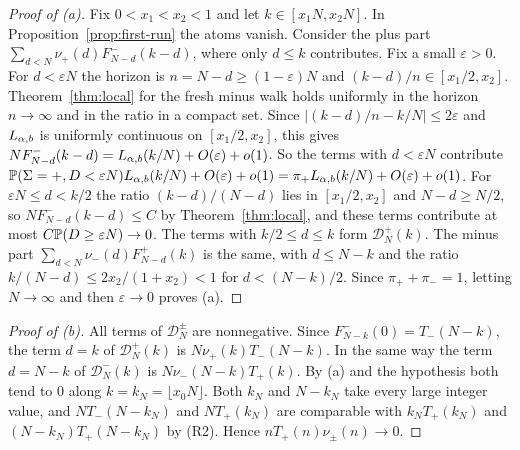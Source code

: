 \begin{proof}[Proof of (a)]
Fix $0<x_1<x_2<1$ and let $k\in[x_1N,x_2N]$. In Proposition~\ref{prop:first-run} the atoms
vanish. Consider the plus part $\sum_{d<N}\nu_\plus(d)F^\minus_{N-d}(k-d)$, where only
$d\le k$ contributes. Fix a small $\varepsilon>0$. For $d<\varepsilon N$ the horizon is
$n=N-d\ge(1-\varepsilon)N$ and $(k-d)/n\in[x_1/2,x_2]$. Theorem~\ref{thm:local} for the
fresh minus walk holds uniformly in the horizon $n\to\infty$ and in the ratio in a
compact set. Since $|(k-d)/n-k/N|\le2\varepsilon$ and $L_{\alpha,b}$ is uniformly continuous on
$[x_1/2,x_2]$, this gives $NF^{-}_{N-d}(k-d)=L_{\alpha,b}(k/N)+O(\varepsilon)+o(1)$. So the
terms with $d<\varepsilon N$ contribute $\mathbb{P}(\Sigma={+},D<\varepsilon N)L_{\alpha,b}(k/N)+O(\varepsilon)+o(1)
=\pi_{+}L_{\alpha,b}(k/N)+O(\varepsilon)+o(1)$. For $\varepsilon N\le d<k/2$ the ratio
$(k-d)/(N-d)$ lies in $[x_1/2,x_2]$ and $N-d\ge N/2$, so $NF^\minus_{N-d}(k-d)\le C$ by
Theorem~\ref{thm:local}, and these terms contribute at most $C\mathbb{P}(D\ge\varepsilon N)\to0$.
The terms with $k/2\le d\le k$ form $\mathcal D^\plus_N(k)$. The minus part
$\sum_{d<N}\nu_\minus(d)F^\plus_{N-d}(k)$ is the same, with $d\le N-k$ and the ratio
$k/(N-d)\le2x_2/(1+x_2)<1$ for $d<(N-k)/2$. Since $\pi_\plus+\pi_\minus=1$, letting
$N\to\infty$ and then $\varepsilon\to0$ proves (a).
\end{proof}

\begin{proof}[Proof of (b)]
All terms of $\mathcal D^\pm_N$ are nonnegative. Since $F^\minus_{N-k}(0)=T_\minus(N-k)$, the
term $d=k$ of $\mathcal D^\plus_N(k)$ is $N\nu_\plus(k)T_\minus(N-k)$. In the same way the
term $d=N-k$ of $\mathcal D^\minus_N(k)$ is $N\nu_\minus(N-k)T_\plus(k)$. By (a) and the hypothesis both tend
to $0$ along $k=k_N=\lfloor x_0N\rfloor$. Both $k_N$ and $N-k_N$ take every large integer
value, and $NT_\minus(N-k_N)$ and $NT_\plus(k_N)$ are comparable with $k_NT_\plus(k_N)$ and
$(N-k_N)T_\plus(N-k_N)$ by (R2). Hence $nT_\plus(n)\nu_\pm(n)\to0$.
\end{proof}


